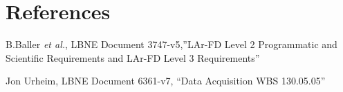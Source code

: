 
\section{References}

\begin{thebibliography}{99}

 B.Baller {\it et al.}, LBNE Document 3747-v5,''LAr-FD Level 2 Programmatic and
Scientific Requirements and LAr-FD Level 3 Requirements''

 Jon Urheim, LBNE Document 6361-v7, ``Data Acquisition WBS 130.05.05''
	               
\end{thebibliography} 